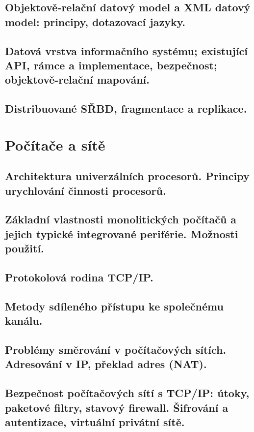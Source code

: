 \documentclass[openany]{book}
\begin{document}
\section{Objektově‐relační datový model a XML datový model: principy, dotazovací jazyky.}

\section{Datová vrstva informačního systému; existující API, rámce a implementace, bezpečnost; objektově-relační mapování.}

\section{Distribuované SŘBD, fragmentace a replikace.}

\chapter{Počítače a sítě}
\section{Architektura univerzálních procesorů. Principy urychlování činnosti procesorů. }

\section{Základní vlastnosti monolitických počítačů a jejich typické integrované periférie. Možnosti použití. }

\section{Protokolová rodina TCP/IP. }

\section{Metody sdíleného přístupu ke společnému kanálu. }

\section{Problémy směrování v počítačových sítích. Adresování v IP, překlad adres (NAT). }

\section{Bezpečnost počítačových sítí s TCP/IP: útoky, paketové filtry, stavový firewall. Šifrování a autentizace, virtuální privátní sítě.  }
\end{document}
